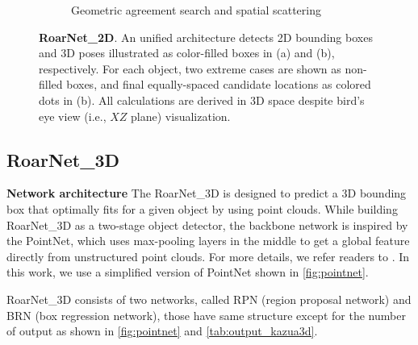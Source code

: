 \documentclass[letterpaper, 10 pt, conference]{ieeeconf}
\newcommand{\subsec}{\quad}
\begin{document}
\begin{figure}
\begin{subfigure}[t]{\linewidth}
         \vspace{-0.5cm}
		\caption{Geometric agreement search and spatial scattering}
        \label{fig:inv_bv}
	\end{subfigure}
\caption{\textbf{RoarNet\_2D}. An unified architecture detects 2D bounding boxes and 3D poses illustrated as color-filled boxes in (a) and (b), respectively. For each object, two extreme cases are shown as non-filled boxes, and final equally-spaced candidate locations as colored dots in (b). All calculations are derived in 3D space despite bird's eye view (i.e., $XZ$ plane) visualization.\label{fig:inverse}}
\end{figure}

\subsection{RoarNet\_3D}\label{sec:roar_3d}
\textbf{Network architecture\subsec}
The RoarNet\_3D is designed to predict a 3D bounding box that optimally fits for a given object by using point clouds. While building RoarNet\_3D as a two-stage object detector, the backbone network is inspired by the PointNet\cite{qi_pointnet_2017}, which uses max-pooling layers in the middle to get a global feature directly from unstructured point clouds. For more details, we refer readers to \cite{qi_pointnet_2017,qi_frustum_2018,qi_pointnet++_2017}. In this work, we use a simplified version of PointNet shown in \cref{fig:pointnet}.

RoarNet\_3D consists of two networks, called RPN (region proposal network) and BRN (box regression network), those have same structure except for the number of output as shown in \cref{fig:pointnet} and \cref{tab:output_kazua3d}.
\end{document}

